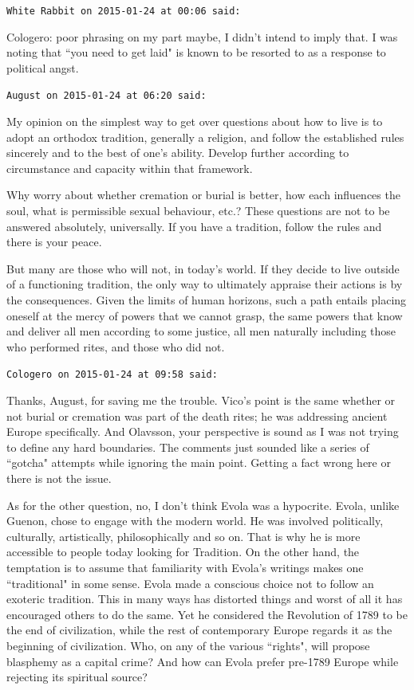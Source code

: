 \begin{footnotesize}
\begin{sffamily}
\hfill

\texttt{White Rabbit on 2015-01-24 at 00:06 said: }

Cologero: poor phrasing on my part maybe, I didn't intend to imply that. I was noting that ``you need to get laid" is known to be resorted to as a response to political angst.


\hfill

\texttt{August on 2015-01-24 at 06:20 said: }

My opinion on the simplest way to get over questions about how to live is to adopt an orthodox tradition, generally a religion, and follow the established rules sincerely and to the best of one's ability. Develop further according to circumstance and capacity within that framework.

Why worry about whether cremation or burial is better, how each influences the soul, what is permissible sexual behaviour, etc.? These questions are not to be answered absolutely, universally. If you have a tradition, follow the rules and there is your peace.

But many are those who will not, in today's world. If they decide to live outside of a functioning tradition, the only way to ultimately appraise their actions is by the consequences. Given the limits of human horizons, such a path entails placing oneself at the mercy of powers that we cannot grasp, the same powers that know and deliver all men according to some justice, all men naturally including those who performed rites, and those who did not.


\hfill

\texttt{Cologero on 2015-01-24 at 09:58 said: }

Thanks, August, for saving me the trouble. Vico's point is the same whether or not burial or cremation was part of the death rites; he was addressing ancient Europe specifically. And Olavsson, your perspective is sound as I was not trying to define any hard boundaries. The comments just sounded like a series of ``gotcha" attempts while ignoring the main point. Getting a fact wrong here or there is not the issue.

As for the other question, no, I don't think Evola was a hypocrite. Evola, unlike Guenon, chose to engage with the modern world. He was involved politically, culturally, artistically, philosophically and so on. That is why he is more accessible to people today looking for Tradition. On the other hand, the temptation is to assume that familiarity with Evola's writings makes one ``traditional" in some sense. Evola made a conscious choice not to follow an exoteric tradition. This in many ways has distorted things and worst of all it has encouraged others to do the same. Yet he considered the Revolution of 1789 to be the end of civilization, while the rest of contemporary Europe regards it as the beginning of civilization. Who, on any of the various ``rights", will propose blasphemy as a capital crime? And how can Evola prefer pre-1789 Europe while rejecting its spiritual source?


\end{sffamily}
\end{footnotesize}
